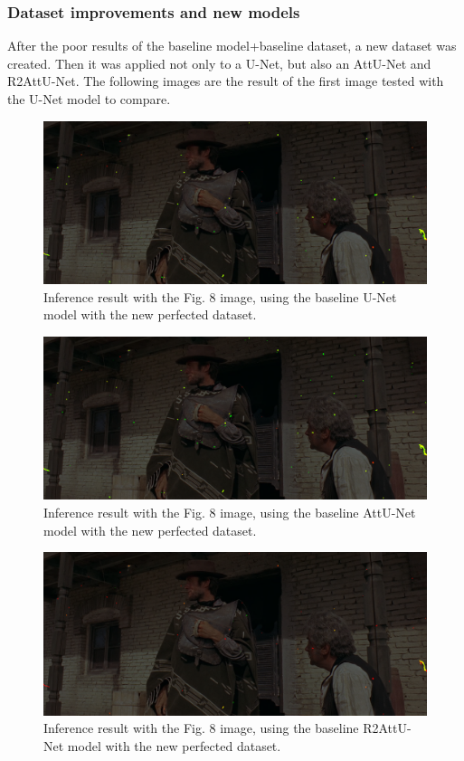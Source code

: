 \documentclass[openany, 12pt]{article}
\begin{document}
\subsubsection*{Dataset improvements and new models}
After the poor results of the baseline model+baseline dataset, a new dataset was created. Then it was applied not only to a U-Net, but also an AttU-Net and R2AttU-Net. The following images are the result of the first image tested with the U-Net model to compare.\\
\begin{figure}[h!]
	\centering
	\includegraphics[width=0.7\linewidth]{images/punado_dollars_frame_0122-mask_big_dataset_unet_50_v1.png_comparaison.png}
	\caption{\smaller Inference result with the Fig. 8 image, using the baseline U-Net model with the new perfected dataset.} 
\end{figure}
\begin{figure}[h!]
	\centering
	\includegraphics[width=0.7\linewidth]{images/punado_dollars_frame_0122-mask_big_dataset_attunet_40_v1.png_comparaison.png}
	\caption{\smaller Inference result with the Fig. 8 image, using the baseline AttU-Net model with the new perfected dataset.} 
	\label{fig:11}
\end{figure}
\begin{figure}[h!]
	\centering
	\includegraphics[width=0.7\linewidth]{images/punado_dollars_frame_0122-mask_big_dataset_r2attunetreduced_60_v1.png_comparaison.png}
	\caption{\smaller Inference result with the Fig. 8 image, using the baseline R2AttU-Net model with the new perfected dataset.} 
\end{figure}
\end{document}
